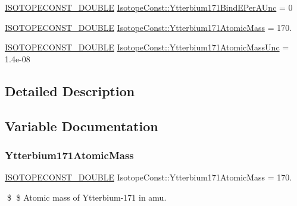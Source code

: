 \begin{DoxyCompactItemize}
\mbox{\hyperlink{group___isotope_const-_macros_ga8f45a7272ce02c0b4c65c44636ed719a}{I\+S\+O\+T\+O\+P\+E\+C\+O\+N\+S\+T\+\_\+\+D\+O\+U\+B\+LE}} \mbox{\hyperlink{group___isotope_const-_ytterbium-_yb171_ga7dd61d47bacc57ffa619cb8e0260cee3}{Isotope\+Const\+::\+Ytterbium171\+Bind\+E\+Per\+A\+Unc}} = 0
\item 
\mbox{\hyperlink{group___isotope_const-_macros_ga8f45a7272ce02c0b4c65c44636ed719a}{I\+S\+O\+T\+O\+P\+E\+C\+O\+N\+S\+T\+\_\+\+D\+O\+U\+B\+LE}} \mbox{\hyperlink{group___isotope_const-_ytterbium-_yb171_ga0b82bd69fbe3be976e78e9aa282be79c}{Isotope\+Const\+::\+Ytterbium171\+Atomic\+Mass}} = 170.
\item 
\mbox{\hyperlink{group___isotope_const-_macros_ga8f45a7272ce02c0b4c65c44636ed719a}{I\+S\+O\+T\+O\+P\+E\+C\+O\+N\+S\+T\+\_\+\+D\+O\+U\+B\+LE}} \mbox{\hyperlink{group___isotope_const-_ytterbium-_yb171_ga532889cf0212ab2235737c3db17b7ef9}{Isotope\+Const\+::\+Ytterbium171\+Atomic\+Mass\+Unc}} = 1.\+4e-\/08
\end{DoxyCompactItemize}


\subsection{Detailed Description}


\subsection{Variable Documentation}
\mbox{\label{group___isotope_const-_ytterbium-_yb171_ga0b82bd69fbe3be976e78e9aa282be79c}} 
\subsubsection{\texorpdfstring{Ytterbium171\+Atomic\+Mass}{Ytterbium171AtomicMass}}
{\footnotesize\ttfamily \mbox{\hyperlink{group___isotope_const-_macros_ga8f45a7272ce02c0b4c65c44636ed719a}{I\+S\+O\+T\+O\+P\+E\+C\+O\+N\+S\+T\+\_\+\+D\+O\+U\+B\+LE}} Isotope\+Const\+::\+Ytterbium171\+Atomic\+Mass = 170.}

\$ \$ Atomic mass of Ytterbium-\/171 in amu. \mbox{\label{group___isotope_const-_ytterbium-_yb171_ga532889cf0212ab2235737c3db17b7ef9}} 
